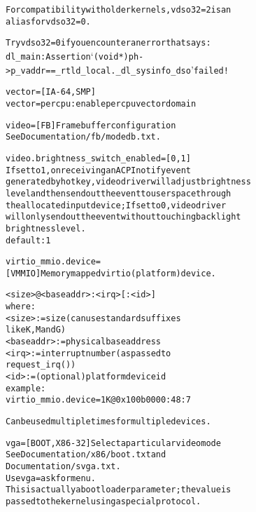 \documentclass[a4paper,8pt,english]{sphinxmanual}
\begin{document}
\begin{alltt}
                        For compatibility with older kernels, vdso32=2 is an
                        alias for vdso32=0.

                        Try vdso32=0 if you encounter an error that says:
                        dl\_main: Assertion {}`(void *) ph-\textgreater{}p\_vaddr == \_rtld\_local.\_dl\_sysinfo\_dso' failed!

        vector=         {[}IA-64,SMP{]}
                        vector=percpu: enable percpu vector domain

        video=          {[}FB{]} Frame buffer configuration
                        See Documentation/fb/modedb.txt.

        video.brightness\_switch\_enabled= {[}0,1{]}
                        If set to 1, on receiving an ACPI notify event
                        generated by hotkey, video driver will adjust brightness
                        level and then send out the event to user space through
                        the allocated input device; If set to 0, video driver
                        will only send out the event without touching backlight
                        brightness level.
                        default: 1

        virtio\_mmio.device=
                        {[}VMMIO{]} Memory mapped virtio (platform) device.

                                \textless{}size\textgreater{}@\textless{}baseaddr\textgreater{}:\textless{}irq\textgreater{}{[}:\textless{}id\textgreater{}{]}
                        where:
                                \textless{}size\textgreater{}     := size (can use standard suffixes
                                                like K, M and G)
                                \textless{}baseaddr\textgreater{} := physical base address
                                \textless{}irq\textgreater{}      := interrupt number (as passed to
                                                request\_irq())
                                \textless{}id\textgreater{}       := (optional) platform device id
                        example:
                                virtio\_mmio.device=1K@0x100b0000:48:7

                        Can be used multiple times for multiple devices.

        vga=            {[}BOOT,X86-32{]} Select a particular video mode
                        See Documentation/x86/boot.txt and
                        Documentation/svga.txt.
                        Use vga=ask for menu.
                        This is actually a boot loader parameter; the value is
                        passed to the kernel using a special protocol.


\end{alltt}
\end{document}
